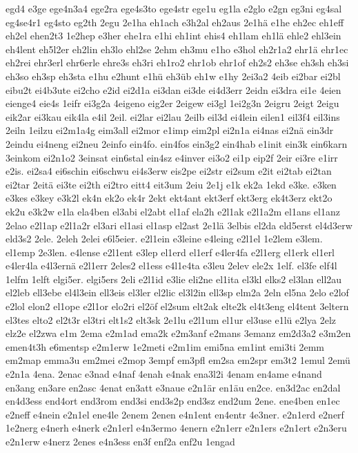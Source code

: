 {egd4
e3ge
ege4n3a4
ege2ra
ege4s3to
ege4str
ege1u
eg1la
e2glo
e2gn
eg3ni
eg4sal
eg4se4r1
eg4sto
eg2th
2egu
2e1ha
eh1ach
e3h2al
eh2aus
2e1hä
e1he
eh2ec
eh1eff
eh2el
ehen2t3
1e2hep
e3her
ehe1ra
e1hi
eh1int
ehis4
eh1lam
eh1lä
ehle2
ehl3ein
eh4lent
eh5l2er
eh2lin
eh3lo
ehl2se
2ehm
eh3mu
e1ho
e3hol
eh2r1a2
ehr1ä
ehr1ec
eh2rei
ehr3erl
ehr6erle
ehre3s
eh3ri
eh1ro2
ehr1ob
ehr1of
eh2s2
eh3se
eh3sh
eh3si
eh3so
eh3sp
eh3sta
e1hu
e2hunt
e1hü
eh3üb
eh1w
e1hy
2ei3a2
4eib
ei2bar
ei2bl
eibu2t
ei4b3ute
ei2cho
e2id
ei2d1a
ei3dan
ei3de
ei4d3err
2eidn
ei3dra
ei1e
4eien
eienge4
eie4s
1eifr
ei3g2a
4eigeno
eig2er
2eigew
ei3gl
1ei2g3n
2eigru
2eigt
2eigu
eik2ar
ei3kau
eik4la
e4il
2eil.
ei2lar
ei2lau
2eilb
eil3d
ei4lein
eilen1
eil3f4
eil3ins
2eiln
1eilzu
ei2m1a4g
eim3all
ei2mor
e1imp
eim2pl
ei2n1a
ei4nas
ei2nä
ein3dr
2eindu
ei4neng
ei2neu
2einfo
ein4fo.
ein4fos
ein3g2
ein4hab
e1init
ein3k
ein6karn
3einkom
ei2n1o2
3einsat
ein6stal
ein4sz
e4inver
ei3o2
ei1p
eip2f
2eir
ei3re
e1irr
e2is.
ei2sa4
ei6schin
ei6schwu
ei4s3erw
eis2pe
ei2str
ei2sum
e2it
ei2tab
ei2tan
ei2tar
2eitä
ei3te
ei2th
ei2tro
eitt4
eit3um
2eiu
2e1j
e1k
ek2a
1ekd
e3ke.
e3ken
e3kes
e3key
e3k2l
ek4n
ek2o
ek4r
2ekt
ekt4ant
ekt3erf
ekt3erg
ek4t3erz
ekt2o
ek2u
e3k2w
e1la
ela4ben
el3abi
el2abt
el1af
ela2h
e2l1ak
e2l1a2m
el1ans
el1anz
2elao
e2l1ap
e2l1a2r
el3ari
el1asi
el1asp
el2ast
2e1lä
3elbis
el2da
eld5erst
el4d3erw
eld3s2
2ele.
2eleh
2elei
e6l5eier.
e2l1ein
e3leine
e4leing
e2l1el
1e2lem
e3lem.
el1emp
2e3len.
e4lense
e2l1ent
e3lep
el1erd
el1erf
e4ler4fa
e2l1erg
el1erk
el1erl
e4ler4la
e4l3ernä
e2l1err
2eles2
el1ess
e4l1e4ta
e3leu
2elev
ele2x
1elf.
el3fe
elf4l
1elfm
1elft
elgi5er.
elgi5ers
2eli
e2l1id
e3lie
eli2ne
el1ita
el3kl
elks2
el3lan
ell2au
el2leb
ell3ebe
el4l3ein
ell3eis
el3ler
el2lic
el3l2in
ell3sp
elm2a
2eln
el5na
2elo
e2lof
e2lol
elon2
el1ope
e2l1or
elo2ri
el2öf
el2sum
elt2ak
elte2k
el4t3eng
el4tent
3eltern
el3tes
elto2
el2t3r
el3tri
elt1s2
elt3sk
2e1lu
e2l1um
el1ur
el3use
e1lü
e2lya
2elz
elz2e
el2zwa
e1m
2ema
e2m1ad
ema2k
e2m3anf
e2mans
3emanz
em2d3a2
e3m2en
emen4t3h
e6mentsp
e2m1erw
1e2meti
e2m1im
emi5na
em1int
emi3ti
2emm
em2map
emma3u
em2mei
e2mop
3empf
em3pfl
em2sa
em2spr
em3t2
1emul
2emü
e2n1a
4ena.
2enac
e3nad
e4naf
4enah
e4nak
ena3l2i
4enam
en4ame
e4nand
en3ang
en3are
en2asc
4enat
en3att
e3naue
e2n1är
en1äu
en2ce.
en3d2ac
en2dal
en4d3ess
end4ort
end3rom
end3si
end3s2p
end3sz
end2um
2ene.
ene4ben
en1ec
e2neff
e4nein
e2n1el
ene4le
2enem
2enen
e4n1ent
en4entr
4e3ner.
e2n1erd
e2nerf
1e2nerg
e4nerh
e4nerk
e2n1erl
e4n3ermo
4enern
e2n1err
e2n1ers
e2n1ert
e2n3eru
e2n1erw
e4nerz
2enes
e4n3ess
en3f
enf2a
enf2u
1engad
}
